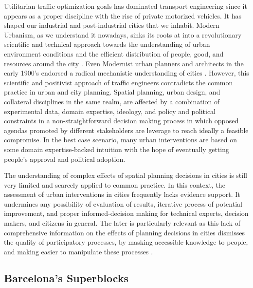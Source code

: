 \documentclass[11pt]{article}
\begin{document}
Utilitarian traffic optimization goals has dominated transport engineering since it appears as a proper discipline with the rise of private motorized vehicles. It has shaped our industrial and post-industrial cities that we inhabit. Modern Urbanism, as we understand it nowadays, sinks its roots at into a revolutionary scientific and technical approach towards the understanding of urban environment conditions and the efficient distribution of people, good, and resources around the city \citep{Cerda1867}. Even Modernist urban planners and architects in the early 1900's endorsed a radical mechanistic understanding of cities \citep{CIAM1933}. However, this scientific and positivist approach of traffic engineers contradicts the common practice in urban and city planning. Spatial planning, urban design, and collateral disciplines in the same realm, are affected by a combination of experimental data, domain expertise, ideology, and policy and political constraints in a non-straightforward decision making process in which opposed agendas promoted by different stakeholders are leverage to reach ideally a feasible compromise. In the best case scenario, many urban interventions are based on some domain expertise-backed intuition with the hope of eventually getting people's approval and political adoption.

The understanding of complex effects of spatial planning decisions in cities is still very limited and scarcely applied to common practice. In this context, the assessment of urban interventions in cities frequently lacks evidence support. It undermines any possibility of evaluation of results, iterative process of potential improvement, and proper informed-decision making for technical experts, decision makers, and citizens in general. The later is particularly relevant as this lack of comprehensive information on the effects of planning decisions in cities dismisses the quality of participatory processes, by masking accessible knowledge to people, and making easier to manipulate these processes \citep{Blundell-Jones2005}\citep{Plaza2020}.

\subsection {Barcelona's Superblocks}
\end{document}
